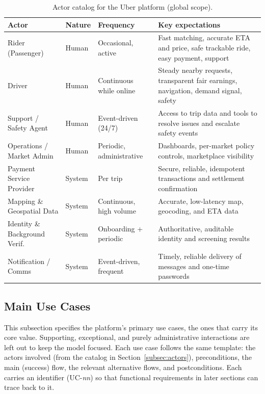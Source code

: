 \begin{table}[H]
  \centering
  \small
  \setlength{\tabcolsep}{4pt}
  \renewcommand{\arraystretch}{1.3}
  \begin{tabular}{@{}p{3.0cm} p{1.4cm} p{2.5cm} p{5.0cm}@{}}
    \toprule
    \textbf{Actor} & \textbf{Nature} & \textbf{Frequency} &
    \textbf{Key expectations} \\
    \midrule
    Rider (Passenger) & Human & Occasional, active &
      Fast matching, accurate ETA and price, safe trackable ride,
      easy payment, support \\
    Driver & Human & Continuous while online &
      Steady nearby requests, transparent fair earnings, navigation,
      demand signal, safety \\
    Support / Safety Agent & Human & Event-driven (24/7) &
      Access to trip data and tools to resolve issues and escalate
      safety events \\
    Operations / Market Admin & Human & Periodic, administrative &
      Dashboards, per-market policy controls, marketplace visibility \\
    Payment Service Provider & System & Per trip &
      Secure, reliable, idempotent transactions and settlement
      confirmation \\
    Mapping \& Geospatial Data & System & Continuous, high volume &
      Accurate, low-latency map, geocoding, and ETA data \\
    Identity \& Background Verif. & System & Onboarding + periodic &
      Authoritative, auditable identity and screening results \\
    Notification / Comms & System & Event-driven, frequent &
      Timely, reliable delivery of messages and one-time passwords \\
    \bottomrule
  \end{tabular}
  \caption{Actor catalog for the Uber platform (global scope).}
  \label{tab:actors}
\end{table}

\subsection{Main Use Cases}
\label{subsec:use-cases}

This subsection specifies the platform's primary use cases, the ones that
carry its core value. Supporting, exceptional, and purely administrative
interactions are left out to keep the model focused. Each use case follows
the same template: the actors involved (from the catalog in
Section~\ref{subsec:actors}), preconditions, the main (success) flow, the
relevant alternative flows, and postconditions. Each carries an identifier
(UC-\emph{nn}) so that functional requirements in later sections can trace
back to it.

